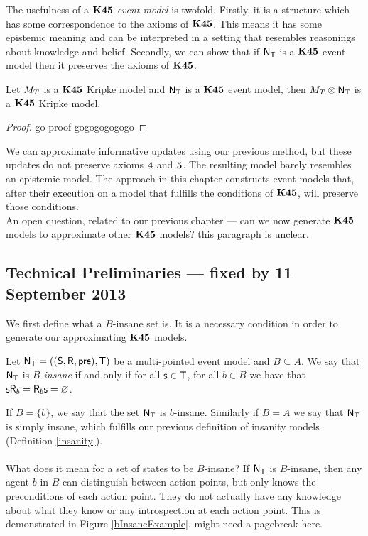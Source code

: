 The usefulness of a {\em $\bf K45$ event model} is twofold.
Firstly, it is a structure which has some correspondence to the axioms of $\bf K45$.
This means it has some epistemic meaning and can be interpreted in a setting that resembles
reasonings about knowledge and belief.
Secondly, we can show that if $\mathrm{\mathsf{N}}_\mathrm{\mathsf{T}}$ is a $\bf K45$ event model then it preserves the axioms of
$\bf K45$.

\begin{lemma} \label{lemma:k45preserved}
	Let $M_T$ is a $\bf K45$ Kripke model and $\mathrm{\mathsf{N}}_\mathrm{\mathsf{T}}$ is a $\bf K45$ event model, then
	$M_T \otimes \mathrm{\mathsf{N}}_\mathrm{\mathsf{T}}$ is a $\bf K45$ Kripke model.
\end{lemma}
\begin{proof}
	\FIXME go proof gogogogogogo
\end{proof}

We can approximate informative updates using our previous method, but these updates do not preserve
axioms $\bf 4$ and $\bf 5$.
The resulting model barely resembles an epistemic model.
The approach in this chapter constructs event models that, after their execution on a model that
fulfills the conditions of $\bf K45$, will preserve those conditions.
\\
An open question, related to our previous chapter --- can we now generate $\bf K45$ models to
approximate other $\bf K45$ models?
\FIXME this paragraph is unclear.

\subsection{Technical Preliminaries --- fixed by 11 September 2013}

We first define what a $B$-insane set is.
It is a necessary condition in order to generate our approximating $\bf K45$ models.

\begin{defn} \label{binsane}
	Let $\mathrm{\mathsf{N}}_\mathrm{\mathsf{T}} = ((\mathrm{\mathsf{S}}, \mathrm{\mathsf{R}}, \mathrm{\mathsf{pre}}), \mathrm{\mathsf{T}})$ be a multi-pointed event model and $B \subseteq A$.
	We say that $\mathrm{\mathsf{N}}_\mathrm{\mathsf{T}}$ is {\em $B$-insane} if and only if for all $\mathrm{\mathsf{s}} \in \mathrm{\mathsf{T}}$,
	for all $b \in B$ we have that $\mathrm{\mathsf{s}} \mathrm{\mathsf{R}}_b = \mathrm{\mathsf{R}}_b \mathrm{\mathsf{s}} = \varnothing$.
\end{defn}

If $B = \{b\}$, we say that the set $\mathrm{\mathsf{N}}_\mathrm{\mathsf{T}}$ is $b$-insane.
Similarly if $B = A$ we say that $\mathrm{\mathsf{N}}_\mathrm{\mathsf{T}}$ is simply insane, which fulfills
our previous definition of insanity models (Definition \ref{insanity}).\\
\\
What does it mean for a set of states to be $B$-insane?
If $\mathrm{\mathsf{N}}_\mathrm{\mathsf{T}}$ is $B$-insane, then any agent $b$ in $B$ can distinguish between
action points, but only knows the preconditions of each action point.
They do not actually have any knowledge about what they know or any
introspection at each action point.
This is demonstrated in Figure \ref{bInsaneExample}.
\FIXME might need a pagebreak here.

